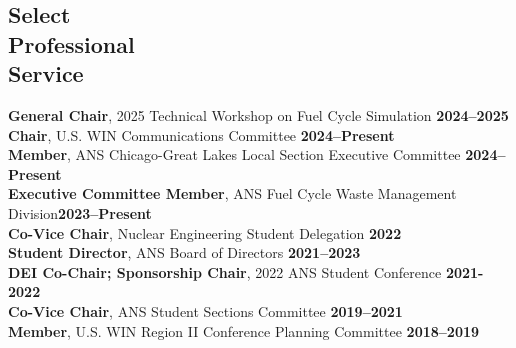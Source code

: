 \documentclass[margin,line]{resume}
\begin{document}
\begin{resume}
    \section{\mysidestyle Select\\Professional\\Service}
        \textbf{General Chair}, 2025 Technical Workshop on Fuel Cycle Simulation \hfill \textbf{2024--2025}\\
        \textbf{Chair}, U.S. WIN Communications Committee \hfill \textbf{2024--Present} \\
        \textbf{Member}, ANS Chicago-Great Lakes Local Section Executive Committee \hfill \textbf{2024--Present}\vspace{0.5mm}\\
        \textbf{Executive Committee Member}, ANS Fuel Cycle Waste Management Division\hfill \textbf{2023--Present}\vspace{0.5mm}\\
        \textbf{Co-Vice Chair}, Nuclear Engineering Student Delegation \hfill \textbf{2022}\vspace{0.5mm}\\
        \textbf{Student Director}, ANS Board of Directors \hfill \textbf{2021--2023}\vspace{.5mm}\\
        \textbf{DEI Co-Chair; Sponsorship Chair}, 2022 ANS Student Conference  \hfill \textbf{2021-2022}\vspace{0.5mm}\\
        \textbf{Co-Vice Chair}, ANS Student Sections Committee \hfill \textbf{2019--2021}\vspace{.5mm}\\%
        \textbf{Member}, U.S. WIN Region II Conference Planning Committee  \hfill \textbf{2018--2019}\vspace{.5mm}\\%
        




\end{resume}
\end{document}
